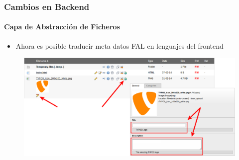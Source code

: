 
\begin{frame}[fragile]
	\frametitle{Cambios en Backend}
	\framesubtitle{Capa de Abstracción de Ficheros}

	\begin{itemize}
		\item Ahora es posible traducir meta datos FAL en lenguajes del frontend
	\end{itemize}

	\begin{figure}
		\includegraphics[width=0.95\linewidth]{Images/BackendChanges/FalTranslateMetaData.png}
	\end{figure}

\end{frame}


